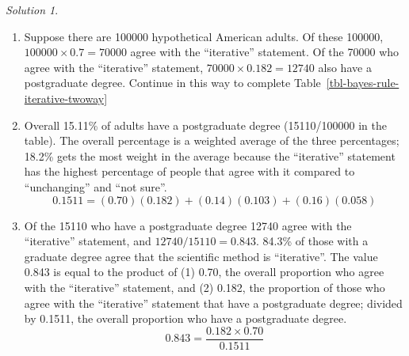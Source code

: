 \documentclass[
  letterpaper,
  DIV=11,
  numbers=noendperiod]{scrreprt}
\providecommand{\tightlist}{%
  \setlength{\itemsep}{0pt}\setlength{\parskip}{0pt}}
\theoremstyle{plain}
\theoremstyle{definition}
\theoremstyle{definition}
\theoremstyle{definition}
\theoremstyle{remark}
\newtheorem{refsolution}{Solution}[chapter]
\begin{document}
\begin{tcolorbox}[enhanced jigsaw, opacityback=0, rightrule=.15mm, coltitle=black, colframe=quarto-callout-tip-color-frame, toprule=.15mm, colbacktitle=quarto-callout-tip-color!10!white, opacitybacktitle=0.6, left=2mm, toptitle=1mm, breakable, title={Solution (click to expand)}, bottomtitle=1mm, colback=white, leftrule=.75mm, titlerule=0mm, arc=.35mm, bottomrule=.15mm]

\begin{refsolution}
\leavevmode

\begin{enumerate}
\def\labelenumi{\arabic{enumi}.}
\tightlist
\item
  Suppose there are 100000 hypothetical American adults. Of these
  100000, \(100000\times 0.7 = 70000\) agree with the ``iterative''
  statement. Of the 70000 who agree with the ``iterative'' statement,
  \(70000\times 0.182 = 12740\) also have a postgraduate degree.
  Continue in this way to complete
  Table~\ref{tbl-bayes-rule-iterative-twoway}
\item
  Overall 15.11\% of adults have a postgraduate degree (15110/100000 in
  the table). The overall percentage is a weighted average of the three
  percentages; 18.2\% gets the most weight in the average because the
  ``iterative'' statement has the highest percentage of people that
  agree with it compared to ``unchanging'' and ``not sure''. \[
  0.1511 = (0.70)(0.182) + (0.14)(0.103) + (0.16)(0.058)  
  \]
\item
  Of the 15110 who have a postgraduate degree 12740 agree with the
  ``iterative'' statement, and \(12740/15110 = 0.843\). 84.3\% of those
  with a graduate degree agree that the scientific method is
  ``iterative''. The value 0.843 is equal to the product of (1) 0.70,
  the overall proportion who agree with the ``iterative'' statement, and
  (2) 0.182, the proportion of those who agree with the ``iterative''
  statement that have a postgraduate degree; divided by 0.1511, the
  overall proportion who have a postgraduate degree. \[
  0.843 = \frac{0.182 \times 0.70}{0.1511} 
  \]
\end{enumerate}

\label{sol-bayes-rule-iterative-twoway}

\end{refsolution}

\end{tcolorbox}
\end{document}
